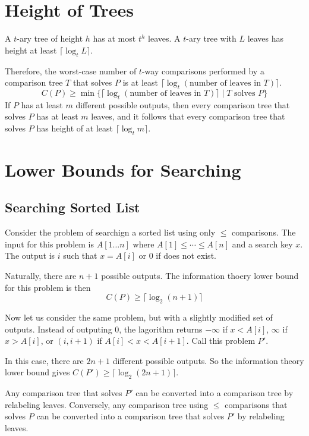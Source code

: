 \section{Height of Trees}

A $t$-ary tree of height $h$ has at most $t^h$ leaves. A $t$-ary tree with $L$ leaves has height at least $\lceil \log_t L \rceil$.

Therefore, the worst-case number of $t$-way comparisons performed by a comparison tree $T$ that solves $P$ is at least $\lceil \log_t (\text{number of leaves in $T$}) \rceil$.
$$
C(P) \geq \min \{ \lceil \log_t (\text{number of leaves in $T$}) \rceil \mid \text{$T$ solves $P$} \}
$$
If $P$ has at least $m$ different possible outputs, then every comparison tree that solves $P$ has at least $m$ leaves, and it follows that every comparison tree that solves $P$ has height of at least $\lceil \log_t m \rceil$.

\section{Lower Bounds for Searching}

\subsection{Searching Sorted List}

Consider the problem of searchign a sorted list using only $\leq$ comparisons. The input for this problem is $A[1\ldots n]$ where $A[1] \leq \cdots \leq A[n]$ and a search key $x$. The output is $i$ such that $x=A[i]$ or 0 if does not exist.

Naturally, there are $n+1$ possible outputs. The information
 thoery lower bound for this problem is then
$$
C(P) \geq \lceil \log_2 (n+1) \rceil
$$

Now let us consider the same problem, but with a slightly modified set of outputs. Instead of outputing 0, the lagorithm returns $-\infty$ if $x < A[i]$, $\infty$ if $x>A[i]$, or $(i,i+1)$ if $A[i] < x < A[i+1]$. Call this problem $P'$.

In this case, there are $2n+1$ different possible outputs. So the information theory lower bound gives $C(P') \geq \lceil \log_2 (2n+1) \rceil$.

Any comparison tree that solves $P'$ can be converted into a comparison tree by relabeling leaves. Conversely, any comparison tree using $\leq$ comparisons that solves $P$ can be converted into a comparison tree that solves $P'$ by relabeling leaves.

